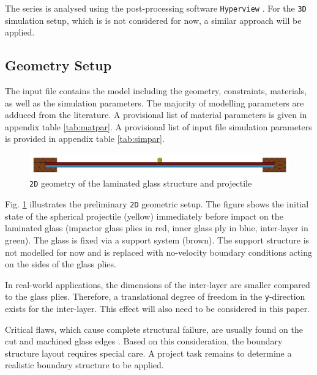 \documentclass[format=acmtog,12pt,screen=true,review=false,natbib=false,]{acmart}
\begin{document}
\bigbreak
The series is analysed using the post-processing software \texttt{Hyperview} \cite{Hyp17}. For the \texttt{3D} simulation setup, which is is not considered for now, a similar approach will be applied.

\subsection{Geometry Setup}
\label{subsec:GeometrySetup}

The input file contains the model including the geometry, constraints, materials, as well as the simulation parameters. The majority of modelling parameters are adduced from the literature. A provisional list of material parameters is given in appendix table \ref{tab:matpar}. A provisional list of input file simulation parameters is provided in appendix table \ref{tab:simpar}.

\begin{figure}[h!]
    \centering
    \includegraphics[width=\columnwidth]{Geometry}
    \caption{\texttt{2D} geometry of the laminated glass structure and projectile \cite{Che18}}
    \label{fig:geometry}
\end{figure}

Fig. \ref{fig:geometry} illustrates the preliminary \texttt{2D} geometric setup. The figure shows the initial state of the spherical projectile (yellow) immediately before impact on the laminated glass (impactor glass plies in red, inner glass ply in blue, inter-layer in green). The glass is fixed via a support system (brown). The support structure is not modelled for now and is replaced with no-velocity boundary conditions acting on the sides of the glass plies. 

\bigbreak
In real-world applications, the dimensions of the inter-layer are smaller compared to the glass plies. Therefore, a translational degree of freedom in the \texttt{y}-direction exists for the inter-layer. This effect will also need to be considered in this paper.

\bigbreak
Critical flaws, which cause complete structural failure, are usually found on the cut and machined glass edges \cite{Pel16}. Based on this consideration, the boundary structure layout requires special care. A project task remains to determine a realistic boundary structure to be applied.
\end{document}
